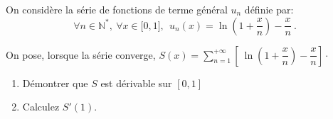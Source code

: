 \documentclass[a4paper,10pt]{report}
\begin{document}
\begin{Exercice}{} On consid\`{e}re la s\'{e}rie de fonctions de terme g\'{e}n\'{e}ral $u_{n}$ d\'{e}finie par: 
\begin{equation*}
\forall n\in \mathbb{N}^{*},\ \forall x\in \lbrack 0,1], \ \ u_{n}\left(x\right) =\ln \left( 1+\dfrac{x}{n}\right) -\dfrac{x}{n}~.
\end{equation*}

On pose, lorsque la s\'{e}rie converge, $S(x)=\displaystyle\sum\limits_{n=1}^{+\infty }\left[ \ \ln \left( 1+\dfrac{x}{n}\right) -\dfrac{x}{n}\right] \cdot$

\begin{enumerate}
\item D\'{e}montrer que $S$ est dérivable sur $[0,1]$
\item Calculez $S'(1)$.
\end{enumerate}
\end{Exercice}

\corr 
\end{document}
